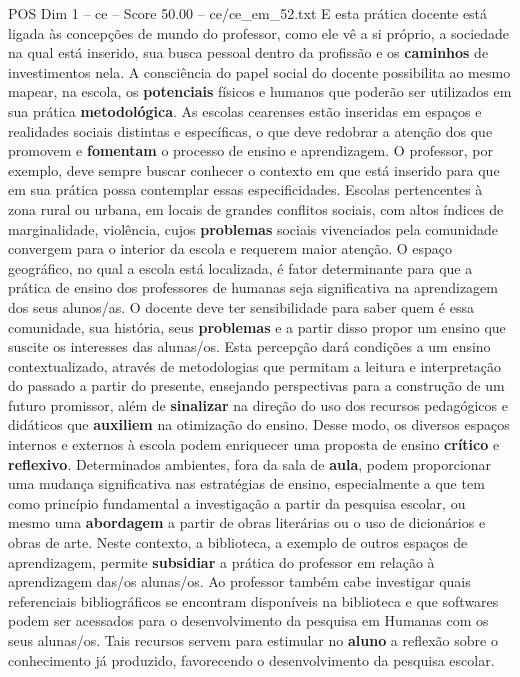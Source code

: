 \begin{textsample}{POS Dim 1 – ce – Score 50.00 – ce/ce\_em\_52.txt}
E esta prática docente está ligada às concepções de mundo do professor, como ele vê a si próprio, a sociedade na qual está inserido, sua busca pessoal dentro da profissão e os \textbf{caminhos} de investimentos nela.
A consciência do papel social do docente possibilita ao mesmo mapear, na escola, os \textbf{potenciais} físicos e humanos que poderão ser utilizados em sua prática \textbf{metodológica}.
As escolas cearenses estão inseridas em espaços e realidades sociais distintas e específicas, o que deve redobrar a atenção dos que promovem e \textbf{fomentam} o processo de ensino e aprendizagem.
O professor, por exemplo, deve sempre buscar conhecer o contexto em que está inserido para que em sua prática possa contemplar essas especificidades.
Escolas pertencentes à zona rural ou urbana, em locais de grandes conflitos sociais, com altos índices de marginalidade, violência, cujos \textbf{problemas} sociais vivenciados pela comunidade convergem para o interior da escola e requerem maior atenção.
O espaço geográfico, no qual a escola está localizada, é fator determinante para que a prática de ensino dos professores de humanas seja significativa na aprendizagem dos seus alunos/as.
O docente deve ter sensibilidade para saber quem é essa comunidade, sua história, seus \textbf{problemas} e a partir disso propor um ensino que suscite os interesses das alunas/os.
Esta percepção dará condições a um ensino contextualizado, através de metodologias que permitam a leitura e interpretação do passado a partir do presente, ensejando perspectivas para a construção de um futuro promissor, além de \textbf{sinalizar} na direção do uso dos recursos pedagógicos e didáticos que \textbf{auxiliem} na otimização do ensino.
Desse modo, os diversos espaços internos e externos à escola podem enriquecer uma proposta de ensino \textbf{crítico} e \textbf{reflexivo}.
Determinados ambientes, fora da sala de \textbf{aula}, podem proporcionar uma mudança significativa nas estratégias de ensino, especialmente a que tem como princípio fundamental a investigação a partir da pesquisa escolar, ou mesmo uma \textbf{abordagem} a partir de obras literárias ou o uso de dicionários e obras de arte.
Neste contexto, a biblioteca, a exemplo de outros espaços de aprendizagem, permite \textbf{subsidiar} a prática do professor em relação à aprendizagem das/os alunas/os.
Ao professor também cabe investigar quais referenciais bibliográficos se encontram disponíveis na biblioteca e que softwares podem ser acessados para o desenvolvimento da pesquisa em Humanas com os seus alunas/os.
Tais recursos servem para estimular no \textbf{aluno} a reflexão sobre o conhecimento já produzido, favorecendo o desenvolvimento da pesquisa escolar.

\end{textsample}
